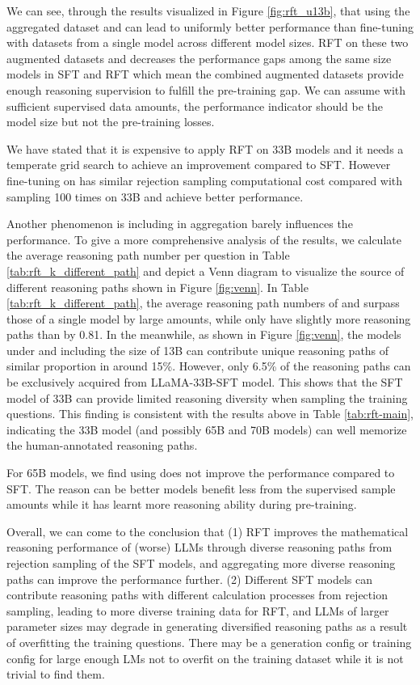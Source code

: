 \documentclass{article} \usepackage{iclr2021_conference,times}
\begin{document}
We can see, through the results visualized in Figure \ref{fig:rft_u13b}, that using the aggregated dataset  and  can lead to uniformly better performance than fine-tuning with datasets from a single model across different model sizes. RFT on these two augmented datasets  and  decreases the performance gaps among the same size models in SFT and RFT  which mean the combined augmented datasets provide enough reasoning supervision to fulfill the pre-training gap.
We can assume with sufficient supervised data amounts, the performance indicator should be the model size but not the pre-training losses. 

We have stated that it is expensive to apply RFT  on 33B models and it needs a temperate grid search to achieve an improvement compared to SFT. However fine-tuning on  has similar rejection sampling computational cost compared with sampling 100 times on 33B and achieve better performance.

Another phenomenon is including  in aggregation barely influences the performance. To give a more comprehensive analysis of the results, we calculate the average reasoning path number per question in Table \ref{tab:rft_k_different_path} and depict a Venn diagram to visualize the source of different reasoning paths shown in Figure \ref{fig:venn}. 
In Table \ref{tab:rft_k_different_path}, the average reasoning path numbers of  and  surpass those of a single model by large amounts, while  only have slightly more reasoning paths than  by 0.81. In the meanwhile, as shown in Figure \ref{fig:venn}, the models under and including the size of 13B can contribute unique reasoning paths of similar proportion in  around 15\%. However, only 6.5\% of the reasoning paths can be exclusively acquired from LLaMA-33B-SFT model. 
This shows that the SFT model of 33B can provide limited reasoning diversity when sampling the training questions. This finding is consistent with the results above in Table \ref{tab:rft-main}, indicating the 33B model (and possibly 65B and 70B models) can well memorize the human-annotated reasoning paths.

For 65B models, we find using  does not improve the performance compared to SFT. The reason can be better models benefit less from the supervised sample amounts while it has learnt more reasoning ability during pre-training.

Overall, we can come to the conclusion that (1) RFT improves the mathematical reasoning performance of (worse) LLMs through diverse reasoning paths from rejection sampling of the SFT models, and aggregating more diverse reasoning paths can improve the performance further. (2) Different SFT models can contribute reasoning paths with different calculation processes from rejection sampling, leading to more diverse training data for RFT, and LLMs of larger parameter sizes may degrade in generating diversified reasoning paths as a result of overfitting the training questions. There may be a generation config or training config for large enough LMs not to overfit on the training dataset while it is not trivial to find them. 
\end{document}
